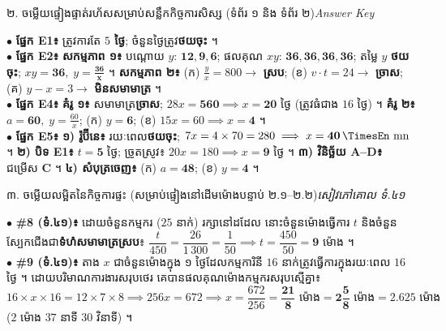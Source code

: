 \documentclass[a4paper,10pt]{article}
\newcommand{\en}[1]{{\TimesEn #1}}
\newcommand{\unit}[1]{\,\text{\en{#1}}}
\newcommand{\secstrip}[2]{%
  \vspace{3pt}%
  \begin{tcolorbox}[
    enhanced, sharp corners, colback=panelgray, colframe=black,
    boxrule=0.8pt, boxsep=0.8pt, top=2pt, bottom=2pt, left=5pt, right=5pt,
    after skip=3pt
  ]
    {\muol\fontsize{8.5pt}{12.2pt}\selectfont #1}\hfill{\fontsize{7.8pt}{10.8pt}\selectfont\textit{#2}}
  \end{tcolorbox}%
}
\begin{document}
\secstrip{២. ចម្លើយផ្ទៀងផ្ទាត់រហ័សសម្រាប់សន្លឹកកិច្ចការសិស្ស (ទំព័រ ១ និង ទំព័រ ២)}{\en{Answer Key}}

\begin{tcolorbox}[
  enhanced, sharp corners, colback=white, colframe=black,
  boxrule=0.8pt, boxsep=1.5pt, top=3pt, bottom=3pt, left=5pt, right=5pt,
  after skip=3.5pt
]
  \fontsize{8.8pt}{13.2pt}\selectfont
  $\bullet$ \textbf{ផ្នែក \en{E1}៖} ត្រូវការតែ \textbf{$5$ ថ្ងៃ}; ចំនួនថ្ងៃត្រូវ\textbf{ថយចុះ} ។\\[2pt]
  $\bullet$ \textbf{ផ្នែក \en{E2}៖} \textbf{សកម្មភាព ១៖} បណ្ដោយ $y$: $\mathbf{12, 9, 6}$; ផលគុណ $xy$: $\mathbf{36, 36, 36, 36}$; តម្លៃ $y$ \textbf{ថយចុះ}; $xy = \mathbf{36},\; y=\mathbf{\frac{36}{x}}$ ។ \textbf{សកម្មភាព ២៖} (ក) $\frac{y}{x}=800 \to$ \textbf{ស្រប}; (ខ) $v\cdot t = 24 \to$ \textbf{ច្រាស}; (គ) $y-x=3 \to$ \textbf{មិនសមាមាត្រ} ។\\[2pt]
  $\bullet$ \textbf{ផ្នែក \en{E4}៖} \textbf{គំរូ ១៖} សមាមាត្រ\textbf{ច្រាស}; $28x = \mathbf{560} \implies x = \mathbf{20}$ ថ្ងៃ (ត្រូវធំជាង $16$ ថ្ងៃ) ។ \textbf{គំរូ ២៖} $a = \mathbf{60},\; y=\frac{60}{x}$; (ក) $y = \mathbf{6}$; (ខ) $15x=60 \implies x = \mathbf{4}$ ។\\[2pt]
  $\bullet$ \textbf{ផ្នែក \en{E5}៖} \textbf{១) រ៉ូប៊ីនេ៖} រយៈពេល\textbf{ថយចុះ}; $7x = 4\times 70 = 280 \implies x = \mathbf{40\unit{mn}}$ ។ \textbf{២) បិទ \en{E1}៖} $t = \mathbf{5}$ ថ្ងៃ; ច្រូតស្រូវ៖ $20x = 180 \implies x = \mathbf{9}$ ថ្ងៃ ។ \textbf{៣) វិនិច្ឆ័យ \en{A--D}៖} ជម្រើស \textbf{\en{C}} ។ \textbf{៤) សំបុត្រចេញ៖} (ក) $a = \mathbf{48}$; (ខ) $y = \mathbf{4}$ ។
\end{tcolorbox}

\secstrip{៣. ចម្លើយលម្អិតនៃកិច្ចការផ្ទះ (សម្រាប់ផ្ទៀងនៅដើមម៉ោងបន្ទាប់ ២.១--២.២)}{សៀវភៅគោល ទំ.៤១}

\begin{tcolorbox}[
  enhanced, sharp corners, colback=white, colframe=black,
  boxrule=0.8pt, boxsep=1.5pt, top=3pt, bottom=3pt, left=5pt, right=5pt
]
  \fontsize{8.7pt}{13.0pt}\selectfont
  $\bullet$ \textbf{\#8 (ទំ.៤១)៖} ដោយចំនួនកម្មករ ($25$ នាក់) រក្សានៅដដែល នោះចំនួនម៉ោងធ្វើការ $t$ និងចំនួនស្បែកជើងជា\textbf{ទំហំសមាមាត្រស្រប}៖ $\dfrac{t}{450} = \dfrac{26}{1\,300} = \dfrac{1}{50} \implies t = \dfrac{450}{50} = \mathbf{9\text{ ម៉ោង}}$ ។\\[3pt]
  $\bullet$ \textbf{\#9 (ទំ.៤១)៖} តាង $x$ ជាចំនួនម៉ោងក្នុង ១ ថ្ងៃដែលកម្មការិនី $16$ នាក់ត្រូវធ្វើការក្នុងរយៈពេល $16$ ថ្ងៃ ។ ដោយបរិមាណការងារសរុបថេរ គេបានផលគុណម៉ោងកម្មករសរុបស្មើគ្នា៖ $16 \times x \times 16 = 12 \times 7 \times 8 \implies 256x = 672 \implies x = \dfrac{672}{256} = \mathbf{\dfrac{21}{8}\text{ ម៉ោង}} = \mathbf{2\dfrac{5}{8}\text{ ម៉ោង}} = \mathbf{2.625\text{ ម៉ោង}}$ ($2$ ម៉ោង $37$ នាទី $30$ វិនាទី) ។
\end{tcolorbox}
\end{document}
